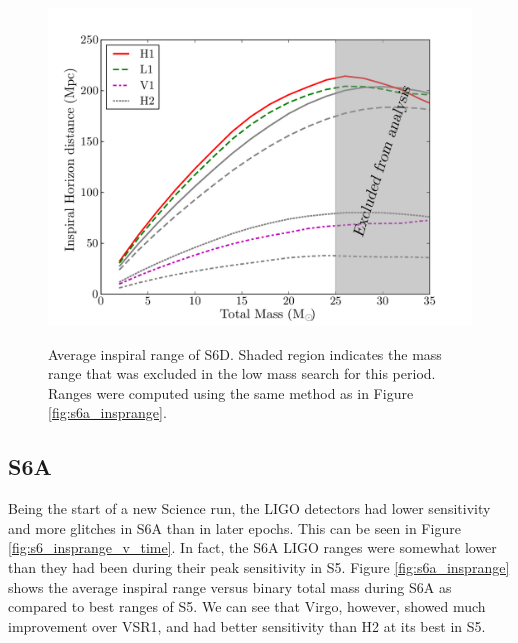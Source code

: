 \begin{figure}[p]
\begin{center}
\label{fig:s6d_insprange}
\includegraphics[width=6in]{figures/s6d_insprange_alt.pdf}
\end{center}
\caption{Average inspiral range of S6D. Shaded region indicates the mass range that was excluded in the low mass search for this period. Ranges were computed using the same method as in Figure \ref{fig:s6a_insprange}.}
\end{figure}

\subsection{S6A}
\label{sec:s6a}

Being the start of a new Science run, the \ac{LIGO} detectors had lower sensitivity and more glitches in S6A than in later epochs. This can be seen in Figure \ref{fig:s6_insprange_v_time}. In fact, the S6A \ac{LIGO} ranges were somewhat lower than they had been during their peak sensitivity in \ac{S5}. Figure \ref{fig:s6a_insprange} shows the average inspiral range versus binary total mass during S6A as compared to best ranges of \ac{S5}. We can see that Virgo, however, showed much improvement over VSR1, and had better sensitivity than H2 at its best in \ac{S5}.

